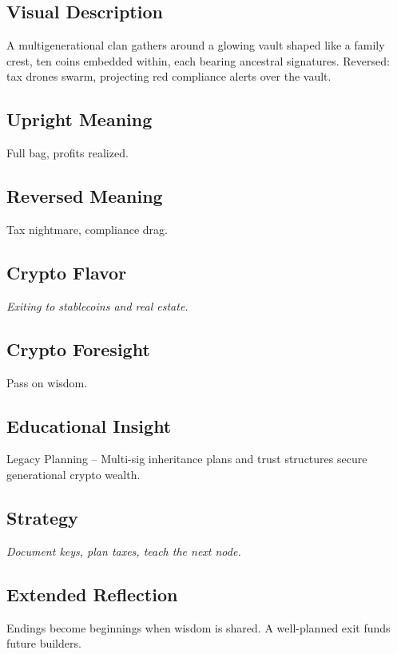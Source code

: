 \documentclass[11pt,oneside]{book}
\begin{document}
\begin{minipage}[t]{0.55\textwidth}
  \vspace{0pt}

  \subsection*{Visual Description}
  A multigenerational clan gathers around a glowing vault shaped like a family crest, ten coins embedded within, each bearing ancestral signatures. Reversed: tax drones swarm, projecting red compliance alerts over the vault.

  \subsection*{Upright Meaning}
  Full bag, profits realized.

  \subsection*{Reversed Meaning}
  Tax nightmare, compliance drag.

  \subsection*{Crypto Flavor}
  \textit{Exiting to stablecoins and real estate.}

  \subsection*{Crypto Foresight}
  Pass on wisdom.

  \subsection*{Educational Insight}
  Legacy Planning – Multi-sig inheritance plans and trust structures secure generational crypto wealth.

  \subsection*{Strategy}
  \textit{Document keys, plan taxes, teach the next node.}

  \subsection*{Extended Reflection}
  Endings become beginnings when wisdom is shared. A well-planned exit funds future builders.


\end{minipage}
\end{document}
